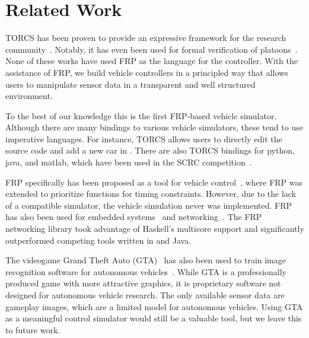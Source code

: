 \section{Related Work}

TORCS has been proven to provide an expressive framework for the research community~\cite{OnievaPAMP09,conf/cig/CardamoneLL09,conf/cig/MunozGS10}. 
Notably, it has even been used for formal verification of platoons~\cite{kamali2016formal,xu2016experimental}. 
None of these works have used FRP as the language for the controller.
With the assistance of FRP, we build vehicle controllers in a principled way that allows users to manipulate sensor data in a transparent and well structured environment.

To the best of our knowledge this is the first FRP-based vehicle simulator.
Although there are many bindings to various vehicle simulators, these tend to use imperative languages.
For instance, TORCS allows users to directly edit the source code and add a new car in \CC.
There are also TORCS bindings for python, java, and matlab, which have been used in the SCRC competition~\cite{SCRC}.

FRP specifically has been proposed as a tool for vehicle control~\cite{kazemi2016,zou2016}, where FRP was extended to prioritize functions for timing constraints. However, due to the lack of a compatible simulator, the vehicle simulation never was implemented. 
FRP has also been used for embedded systems~\cite{helbling2016juniper} and networking~\cite{voellmy2012scalable}.
The FRP networking library took advantage of Haskell's multicore support and significantly outperformed competing tools written in \CC and Java.

The videogame Grand Theft Auto (GTA)~\cite{gtaV} has also been used to train image recognition software for autonomous vehicles~\cite{gtaPrinceton}.
While GTA is a professionally produced game with more attractive graphics, it is proprietary software not designed for autonomous vehicle research.
The only available sensor data are gameplay images, which are a limited model for autonomous vehicles.
Using GTA as a meaningful control simulator would still be a valuable tool, but we leave this to future work.
